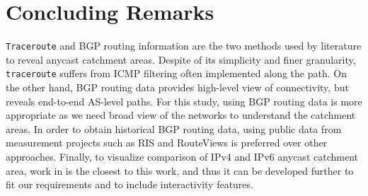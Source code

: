 \section{Concluding Remarks}
\label{ch02:concluding}
\texttt{Traceroute} and BGP routing information are the two methods used by literature to reveal anycast catchment areas. Despite of its simplicity and finer granularity, \texttt{traceroute} suffers from ICMP filtering often implemented along the path. On the other hand, BGP routing data provides high-level view of connectivity, but reveals end-to-end AS-level paths. For this study, using BGP routing data is more appropriate as we need broad view of the networks to understand the catchment areas. In order to obtain historical BGP routing data, using public data from measurement projects such as RIS and RouteViews is preferred over other approaches. Finally, to visualize comparison of IPv4 and IPv6  anycast catchment area, work in \cite{github-anycast} is the closest to this work, and thus it can be developed further to fit our requirements and to include interactivity features.
